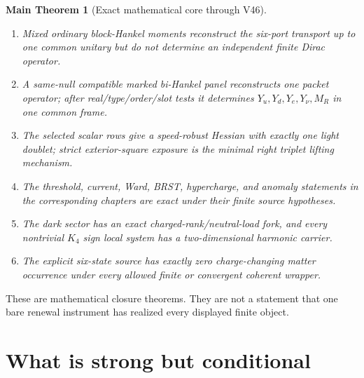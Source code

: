 \documentclass[11pt,oneside,openany]{book}
\numberwithin{equation}{chapter}
\newtheorem{maintheorem}[theorem]{Main Theorem}
\theoremstyle{definition}
\theoremstyle{remark}
\begin{document}
\begin{maintheorem}[Exact mathematical core through V46]
\begin{enumerate}[label=\textup{(U\arabic*)},leftmargin=2.8em]
      positive-Gram operations and cannot create absent raw edges.
\item Mixed ordinary block-Hankel moments reconstruct the six-port transport
      up to one common unitary but do not determine an independent finite
      Dirac operator.
\item A same-null compatible marked bi-Hankel panel reconstructs one packet
      operator; after real/type/order/slot tests it determines
      \(Y_u,Y_d,Y_e,Y_\nu,M_R\) in one common frame.
\item The selected scalar rows give a speed-robust Hessian with exactly one
      light doublet; strict exterior-square exposure is the minimal right
      triplet lifting mechanism.
\item The threshold, current, Ward, BRST, hypercharge, and anomaly statements
      in the corresponding chapters are exact under their finite source
      hypotheses.
\item The dark sector has an exact charged-rank/neutral-load fork, and every
      nontrivial \(K_4\) sign local system has a two-dimensional harmonic carrier.
\item The explicit six-state source has exactly zero charge-changing matter
      occurrence under every allowed finite or convergent coherent wrapper.
\end{enumerate}
\end{maintheorem}

These are mathematical closure theorems.  They are not a statement that one
bare renewal instrument has realized every displayed finite object.

\chapter{What is strong but conditional}
\label{ch:conditional-core}
\end{document}
